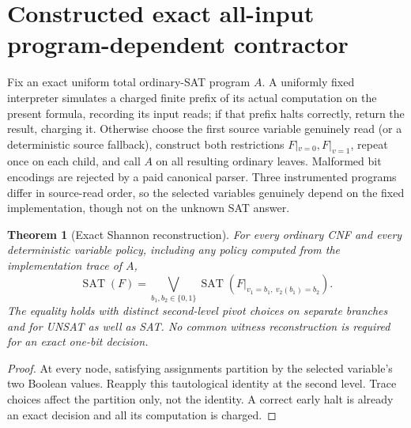 \documentclass[11pt]{article}
\newtheorem{theorem}{Theorem}
\begin{document}
\section{Constructed exact all-input program-dependent contractor}
Fix an exact uniform total ordinary-SAT program $A$. A uniformly fixed interpreter simulates a charged finite prefix of its actual computation on the present formula, recording its input reads; if that prefix halts correctly, return the result, charging it. Otherwise choose the first source variable genuinely read (or a deterministic source fallback), construct both restrictions $F|_{v=0},F|_{v=1}$, repeat once on each child, and call $A$ on all resulting ordinary leaves. Malformed bit encodings are rejected by a paid canonical parser. Three instrumented programs differ in source-read order, so the selected variables genuinely depend on the fixed implementation, though not on the unknown SAT answer.
\begin{theorem}[Exact Shannon reconstruction]
For every ordinary CNF and every deterministic variable policy, including any policy computed from the implementation trace of $A$,
\[
\operatorname{SAT}(F)
=\bigvee_{b_1,b_2\in\{0,1\}}
\operatorname{SAT}(F|_{v_1=b_1,\ v_2(b_1)=b_2}).
\]
The equality holds with distinct second-level pivot choices on separate branches and for UNSAT as well as SAT. No common witness reconstruction is required for an exact one-bit decision.
\end{theorem}
\begin{proof}At every node, satisfying assignments partition by the selected variable's two Boolean values. Reapply this tautological identity at the second level. Trace choices affect the partition only, not the identity. A correct early halt is already an exact decision and all its computation is charged.\end{proof}
\end{document}
